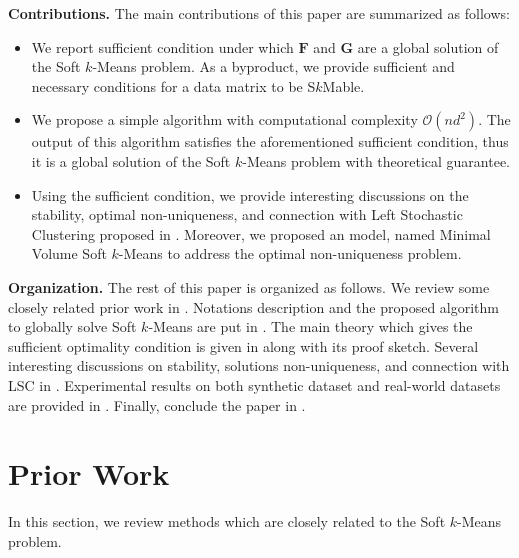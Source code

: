 \documentclass[journal]{IEEEtran}
\begin{document}
\textbf{Contributions.} The main contributions of this paper are summarized as follows:
\begin{itemize}
	\item We report sufficient condition under which $\mathbf{F}$ and $\mathbf{G}$ are a global solution of the Soft $k$-Means problem. As a byproduct, we provide sufficient and necessary conditions for a data matrix to be S$k$Mable.
	\item We propose a simple algorithm with computational complexity $\mathcal{O}(nd^2)$. The output of this algorithm satisfies the aforementioned sufficient condition, thus it is a global solution of the Soft $k$-Means problem with theoretical guarantee.
	\item Using the sufficient condition, we provide interesting discussions on the stability, optimal non-uniqueness, and connection with Left Stochastic Clustering proposed in \cite{arora2013similarity}. Moreover, we proposed an model, named Minimal Volume Soft $k$-Means to address the optimal non-uniqueness problem.
\end{itemize}

\textbf{Organization.} 
The rest of this paper is organized as follows. 
We review some closely related prior work in .
Notations description and the proposed algorithm to globally solve Soft $k$-Means are put in .
The main theory which gives the sufficient optimality condition is given in  along with its proof sketch.
Several interesting discussions on stability, solutions non-uniqueness, and connection with LSC in .
Experimental results on both synthetic dataset and real-world datasets are provided in .
Finally, conclude the paper in .

\section{Prior Work}\label{sec:prior}
In this section, we review methods which are closely related to the Soft $k$-Means problem.
\end{document}
